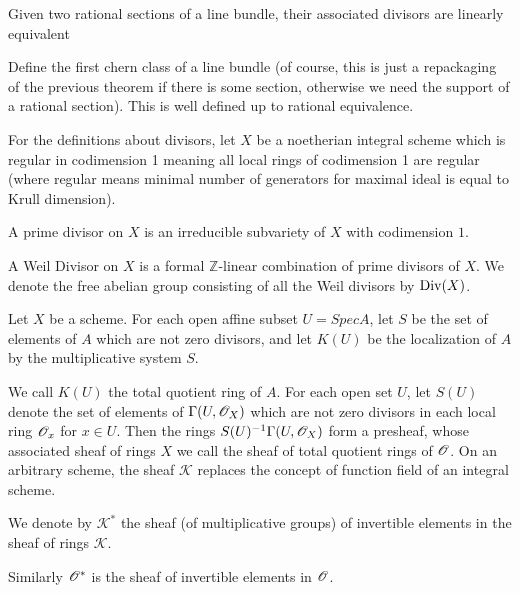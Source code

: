 \begin{theorem}
  \label{thm:sectiondivisorrational}
  Given two rational sections of a line bundle, their associated divisors are linearly equivalent
\end{theorem}

\begin{definition}
  \label{def:firstchernclass}
  Define the first chern class of a line bundle (of course, this is just a repackaging
  of the previous theorem if there is some section, otherwise we need the support of 
  a rational section). This is well defined up to rational equivalence.
\end{definition}

\begin{definition}

\end{definition}


For the definitions about divisors, let $X$ be a noetherian integral scheme
which is regular in codimension 1 meaning all local rings of codimension 1 are
regular (where regular means minimal number of generators for maximal ideal is
equal to Krull dimension).

\begin{definition}\label{def:primediv}
  A prime divisor on $X$ is an irreducible subvariety of $X$ with codimension $1$.
  \end{definition}

\begin{definition}\label{def:weil}
  A Weil Divisor on $X$ is a formal $\mathbb{Z}$-linear combination of prime divisors of $X$. We denote the free abelian group consisting of all the Weil divisors by $\operatorname{Div}(X)$.
\end{definition}

\begin{definition}[Hartshorne p.140]\label{def:constratsheaf}
  Let $X$ be a scheme. For each open affine subset $U = Spec A$,
  let $S$ be the set of elements of $A$ which are not zero divisors,
  and let $K(U)$ be the localization of $A$ by the multiplicative system $S$.

  We call $K(U)$ the total quotient ring of $A$.
  For each open set $U$, let $S(U)$ denote the set of elements of
  $\Gamma(U, \mathscr{O}_X)$ which are not zero divisors in each local ring $\mathscr{O}_x$ for $x \in U$.
  Then the rings $S(U)^{-1} \Gamma(U,\mathscr{O}_X)$ form a presheaf,
  whose associated sheaf of rings $X$ we call the sheaf of total quotient rings
  of $\mathscr{O}$. On an arbitrary scheme, the sheaf $\mathscr{K}$ replaces the concept
  of function field of an integral scheme.

  We denote by $\mathscr{K}^*$ the sheaf (of multiplicative groups)
  of invertible elements in the sheaf of rings $\mathscr{K}$.

  Similarly $\mathscr{O}^*$ is the sheaf of invertible elements in $\mathscr{O}$.
\end{definition}

